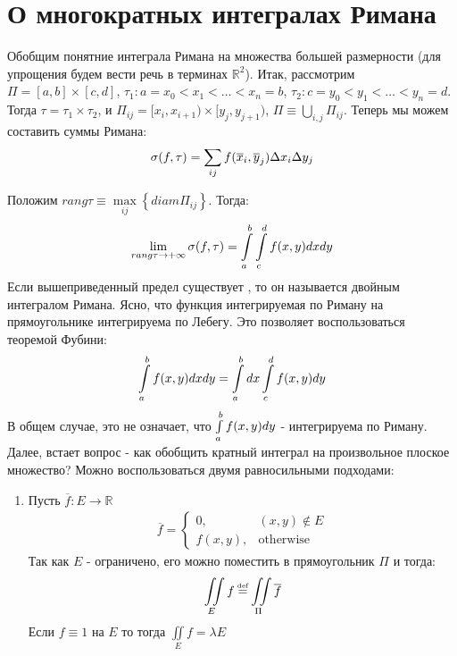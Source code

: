 \section{О многократных интегралах Римана}

Обобщим понятние интеграла Римана на множества большей размерности 
(для упрощения будем вести речь в терминах $\mathbb{R}^2$).
Итак, рассмотрим $\Pi = [a, b] \times [c, d]$, $\tau_1 : a = x_0 < x_1 < \dots < x_n = b$, 
$\tau_2 : c = y_0 < y_1 < \dots < y_n = d$. 
Тогда $\tau = \tau_1 \times \tau_2$, и 
$\Pi_{ij} = [x_i, x_{i + 1}) \times [y_j, y_{j + 1})$, $\Pi \equiv \bigcup\limits_{i, j} \Pi_{ij}$.
Теперь мы можем составить суммы Римана:
\begin{gather*}
	\sigma(f, \tau) = \sum\limits_{ij} f(\overline{x}_i, \overline{y}_j)\Delta x_i	\Delta y_j
\end{gather*}

Положим $rang\tau \equiv \max\limits_{ij}\left\{ diam \Pi_{ij}\right\}$.
Тогда:
\begin{gather*}
	\lim\limits_{rang\tau\rightarrow +\infty} \sigma(f, \tau) = \int\limits_{a}^{b}\int\limits_{c}^{d}f(x, y)dxdy
\end{gather*}
Если вышеприведенный предел существует , то он называется двойным интегралом Римана. 
Ясно, что функция интегрируемая по Риману на прямоугольнике интегрируема по Лебегу. 
Это позволяет воспользоваться теоремой Фубини:
\begin{gather*}
	\int\limits_{a}^{b}f(x, y)dxdy = \int\limits_{a}^{b}dx\int\limits_{c}^{d}f(x, y)dy
\end{gather*}
В общем случае, это не означает, что $\int\limits_{a}^{b}f(x, y)dy$ - интегрируема по Риману.
Далее, встает вопрос - как обобщить кратный интеграл на произвольное плоское множество?
Можно воспользоваться двумя равносильными подходами:
\begin{enumerate}
	\item 
		Пусть $\overline{f}: E \rightarrow \mathbb{R}$
		\begin{gather*}
			\overline{f} =  \left\{\begin{matrix}
				0,& (x, y) \notin E
									\\ 
										f(x, y), &\text{otherwise}
									\end{matrix}\right.
		\end{gather*}
		Так как $E$ - ограничено, его можно поместить в прямоугольник $\Pi$ и тогда:
		\begin{gather*}
			\iint\limits_{E}f \defeq \iint\limits_{\Pi} \overline{f}
		\end{gather*}
		Если $f \equiv 1$ на $E$ то тогда
		$\iint\limits_{E}f = \lambda E$
\end{enumerate}

